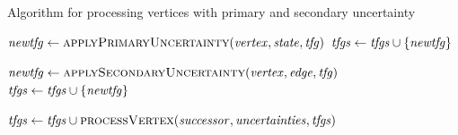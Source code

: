 \begin{algorithm}
    \caption{Algorithm for processing vertices with primary and secondary uncertainty}
    \label{alg:confidentialityanalysis:processvertex}
    \begin{algorithmic}[1]
            \algindentskip

             \label{alg:confidentialityanalysis:processvertex:2}
                        \State $\mathit{newtfg} \gets \textsc{applyPrimaryUncertainty}(\mathit{vertex}, \mathit{state}, \mathit{tfg})$
                        \State $\mathit{tfgs} \gets \mathit{tfgs} \cup \{ \mathit{newtfg} \}$
                    \EndFor
                \EndFor
            \EndIf
            \algblockskip

             \label{alg:confidentialityanalysis:processvertex:10}
                        \State $\mathit{newtfg} \gets \textsc{applySecondaryUncertainty}(\mathit{vertex}, \mathit{edge}, \mathit{tfg})$ \label{alg:confidentialityanalysis:processvertex:13}
                        \State $\mathit{tfgs} \gets \mathit{tfgs} \cup \{ \mathit{newtfg} \}$
                    \EndFor
                \EndIf
            \EndFor

                \State $\mathit{tfgs} \gets \mathit{tfgs} \cup \textsc{processVertex}(\mathit{successor}, \mathit{uncertainties}, \mathit{tfgs})$ \label{alg:confidentialityanalysis:processvertex:19}
            \EndFor
            \algblockskip

            \State {}
        \EndProcedure   
    \end{algorithmic}
\end{algorithm}

